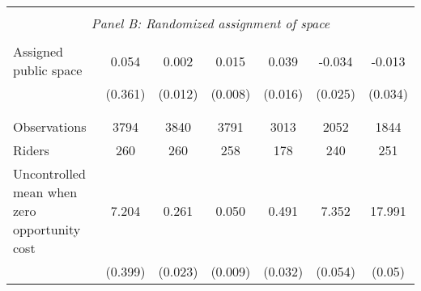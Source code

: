 \begin{tabular}{l*{6}{c}}
\hline \\[-1ex] \multicolumn{7}{c}{\textit{Panel B: Randomized assignment of space}} \\\\[-1ex]
Assigned public space&       0.054         &       0.002         &       0.015\sym{*}  &       0.039\sym{**} &      -0.034         &      -0.013         \\
                    &     (0.361)         &     (0.012)         &     (0.008)         &     (0.016)         &     (0.025)         &     (0.034)         \\
\\[-1.8ex] \hline \\[-1.8ex]  
Observations        &        3794         &        3840         &        3791         &        3013         &        2052         &        1844         \\
Riders              &         260         &         260         &         258         &         178         &         240         &         251         \\
Uncontrolled mean when zero opportunity cost&       7.204         &       0.261         &       0.050         &       0.491         &       7.352         &      17.991         \\
\,                  &     (0.399)         &     (0.023)         &     (0.009)         &     (0.032)         &     (0.054)         &      (0.05)         \\
\hline\hline \end{tabular}
